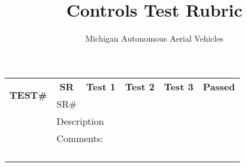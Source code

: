 \documentclass[]{article}
\title{Controls Test Rubric}
\author{Michigan Autonomous Aerial Vehicles}
\begin{document}
\maketitle

\begin{abstract}

\end{abstract}

\large
\begin{tabular}{
p{}|
p{}|
p{}|
p{}|
p{}|
p{}|
}
\hline\hline
\multicolumn{1}{|c|}{\multirow{3}{*}{\textbf{TEST\#}}} & 
\multicolumn{1}{|c|}{\textbf{SR}} & 
\multicolumn{1}{|c|}{\textbf{Test 1}} & 
\multicolumn{1}{|c|}{\textbf{Test 2}} & 
\multicolumn{1}{|c|}{\textbf{Test 3}} &
\multicolumn{1}{|c|}{\textbf{Passed}}\\
\cline{2-6}  
\multicolumn{1}{|c|}{} & \multicolumn{1}{|c|}{\multirow{2}{*}{SR\#}} &  &  &  & \\
\multicolumn{1}{|c|}{} &  &  &  &  & \\
\hline 
     & \multicolumn{5}{|p{\dimexpr 0.90\linewidth-2\tabcolsep}|}{
           Description
     } \\
\cline{2-6}
     & \multicolumn{5}{|p{\dimexpr 0.90\linewidth-2\tabcolsep}|}{
           Comments:
     } \\
     & \multicolumn{5}{|c|}{}\\
     & \multicolumn{5}{|c|}{}\\
     & \multicolumn{5}{|c|}{}\\
     & \multicolumn{5}{|c|}{}\\ \cline{2-6}\cline{2-6}
     
\end{tabular}
\end{document}
